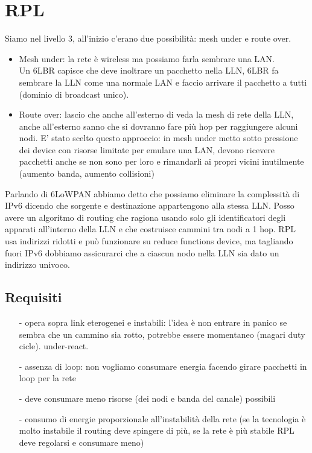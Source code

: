 \documentclass[12pt,italian]{report}
\begin{document}
\section{RPL}
Siamo nel livello 3, all'inizio c'erano due possibilità: mesh under e route over.
\begin{itemize}
    \item Mesh under: la rete è wireless ma possiamo farla sembrare una LAN. \\ Un 6LBR capisce che deve inoltrare un pacchetto nella LLN, 6LBR fa sembrare la LLN come una normale LAN e faccio arrivare il pacchetto a tutti (dominio di broadcast unico).
    \item Route over: lascio che anche all'esterno di veda la mesh di rete della LLN, anche all'esterno sanno che si dovranno fare più hop per raggiungere alcuni nodi. 
    \bigbreak
    E' stato scelto questo approccio: in mesh under metto sotto pressione dei device con risorse limitate per emulare una LAN, devono ricevere pacchetti anche se non sono per loro e rimandarli ai propri vicini inutilmente (aumento banda, aumento collisioni)
\end{itemize}
Parlando di 6LoWPAN abbiamo detto che possiamo eliminare la complessità di IPv6 dicendo che sorgente e destinazione appartengono alla stessa LLN. Posso avere un algoritmo di routing che ragiona usando solo gli identificatori degli apparati all'interno della LLN e che costruisce cammini tra nodi a 1 hop. 
\bigbreak
RPL usa indirizzi ridotti e può funzionare su reduce functions device, ma tagliando fuori IPv6 dobbiamo assicurarci che a ciascun nodo nella LLN sia dato un indirizzo univoco. 

\subsection{Requisiti}
\begin{itemize}
    \item [-] opera sopra link eterogenei e instabili: l'idea è non entrare in panico se sembra che un cammino sia rotto, potrebbe essere momentaneo (magari duty cicle). under-react.
    \item [-] assenza di loop: non vogliamo consumare energia facendo girare pacchetti in loop per la rete
    \item [-] deve consumare meno risorse (dei nodi e banda del canale) possibili
    \item [-] consumo di energie proporzionale all'instabilità della rete (se la tecnologia è molto instabile il routing deve spingere di più, se la rete è più stabile RPL deve regolarsi e consumare meno)
\end{itemize}
\end{document}
